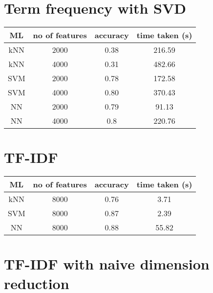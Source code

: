 \section{Term frequency with SVD}

\begin{center}
	\begin{tabular}{|| c | c | c | c||}
		\hline
		ML & no of features & accuracy & time taken (s) \\ [0.5ex]
		\hline\hline
		kNN & 2000 & 0.38 & 216.59 \\ 
		\hline
		kNN & 4000 & 0.31 & 482.66 \\
		\hline\hline
		SVM & 2000 & 0.78 & 172.58 \\
		\hline
		SVM & 4000 & 0.80 & 370.43 \\
		\hline\hline
		NN & 2000 & 0.79 & 91.13 \\
		\hline
		NN & 4000 & 0.8 & 220.76 \\
		\hline\hline
	\end{tabular}
\end{center}


\section{TF-IDF}

\begin{center}
	\begin{tabular}{|| c | c | c | c||}
		\hline
		ML & no of features & accuracy & time taken (s) \\ [0.5ex]
		\hline\hline
		kNN & 8000 & 0.76 & 3.71 \\ 
		\hline
		SVM & 8000 & 0.87 & 2.39 \\
		\hline
		NN & 8000 & 0.88 & 55.82 \\
		\hline
	\end{tabular}
\end{center}

\section{TF-IDF with naive dimension reduction}

